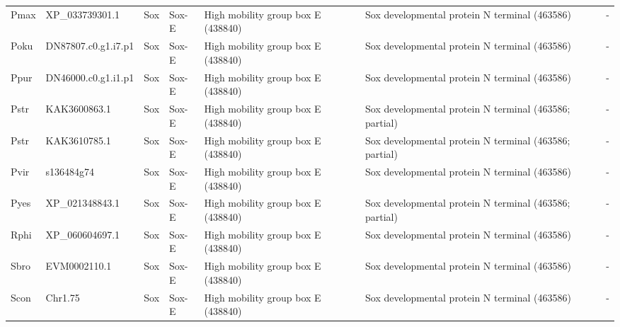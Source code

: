 \documentclass[../main.tex]{subfiles}
\begin{document}
\begin{landscape}
\begin{longtable}{lllllll}
		Pmax           & XP\_033739301.1       & Sox            & Sox-E               & High mobility group box E (438840)          & Sox developmental protein N terminal (463586)                          & -                    \\
		Poku           & DN87807.c0.g1.i7.p1   & Sox            & Sox-E               & High mobility group box E (438840)          & Sox developmental protein N terminal (463586)                          & -                    \\
		Ppur           & DN46000.c0.g1.i1.p1   & Sox            & Sox-E               & High mobility group box E (438840)          & Sox developmental protein N terminal (463586)                          & -                    \\
		Pstr           & KAK3600863.1          & Sox            & Sox-E               & High mobility group box E (438840)          & Sox developmental protein N terminal (463586; partial)                 & -                    \\
		Pstr           & KAK3610785.1          & Sox            & Sox-E               & High mobility group box E (438840)          & Sox developmental protein N terminal (463586; partial)                 & -                    \\
		Pvir           & s136484g74            & Sox            & Sox-E               & High mobility group box E (438840)          & Sox developmental protein N terminal (463586)                          & -                    \\
		Pyes           & XP\_021348843.1       & Sox            & Sox-E               & High mobility group box E (438840)          & Sox developmental protein N terminal (463586; partial)                 & -                    \\
		Rphi           & XP\_060604697.1       & Sox            & Sox-E               & High mobility group box E (438840)          & Sox developmental protein N terminal (463586)                          & -                    \\
		Sbro           & EVM0002110.1          & Sox            & Sox-E               & High mobility group box E (438840)          & Sox developmental protein N terminal (463586)                          & -                    \\
		Scon           & Chr1.75               & Sox            & Sox-E               & High mobility group box E (438840)          & Sox developmental protein N terminal (463586)                          & -                    \\

\end{longtable}
\end{landscape}
\end{document}
